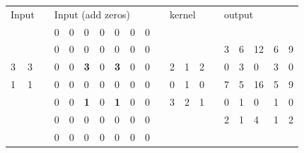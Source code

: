 \begin{table}
    \begin{tabular}{llllllllllllllllllll}
        \toprule
        \multicolumn{2}{l}{Input} &
           &
          \multicolumn{7}{l}{Input (add zeros)} &
           &
          \multicolumn{3}{l}{kernel} &
           &
          \multicolumn{5}{l}{output} \\ \cline{4-6}
         &
           &
          \multicolumn{1}{l|}{} &
          0 &
          0 &
          \multicolumn{1}{l|}{0} &
          0 &
          0 &
          0 &
          0 &
           &
           &
           &
           &
           &
           &
           &
           &
           &
           \\ \cline{16-16}
         &
           &
          \multicolumn{1}{l|}{} &
          0 &
          0 &
          \multicolumn{1}{l|}{0} &
          0 &
          0 &
          0 &
          0 &
           &
           &
           &
           &
          \multicolumn{1}{l|}{} &
          \multicolumn{1}{l|}{3} &
          6 &
          12 &
          6 &
          9 \\ \cline{12-14} \cline{16-16}
        3 &
          3 &
          \multicolumn{1}{l|}{} &
          0 &
          0 &
          \multicolumn{1}{l|}{\textbf{3}} &
          0 &
          \textbf{3} &
          0 &
          0 &
          \multicolumn{1}{l|}{} &
          2 &
          1 &
          \multicolumn{1}{l|}{2} &
           &
          0 &
          3 &
          0 &
          3 &
          0 \\ \cline{4-6}
        1 &
          1 &
           &
          0 &
          0 &
          0 &
          0 &
          0 &
          0 &
          0 &
          \multicolumn{1}{l|}{} &
          0 &
          1 &
          \multicolumn{1}{l|}{0} &
           &
          7 &
          5 &
          16 &
          5 &
          9 \\
         &
           &
           &
          0 &
          0 &
          \textbf{1} &
          0 &
          \textbf{1} &
          0 &
          0 &
          \multicolumn{1}{l|}{} &
          3 &
          2 &
          \multicolumn{1}{l|}{1} &
           &
          0 &
          1 &
          0 &
          1 &
          0 \\ \cline{12-14}
         &
           &
           &
          0 &
          0 &
          0 &
          0 &
          0 &
          0 &
          0 &
           &
           &
           &
           &
           &
          2 &
          1 &
          4 &
          1 &
          2 \\
         &
           &
           &
          0 &
          0 &
          0 &
          0 &
          0 &
          0 &
          0 &
           &
           &
           &
           &
           &
           &
           &
           &
           & \\ \bottomrule
          

\end{tabular}
\end{table}
